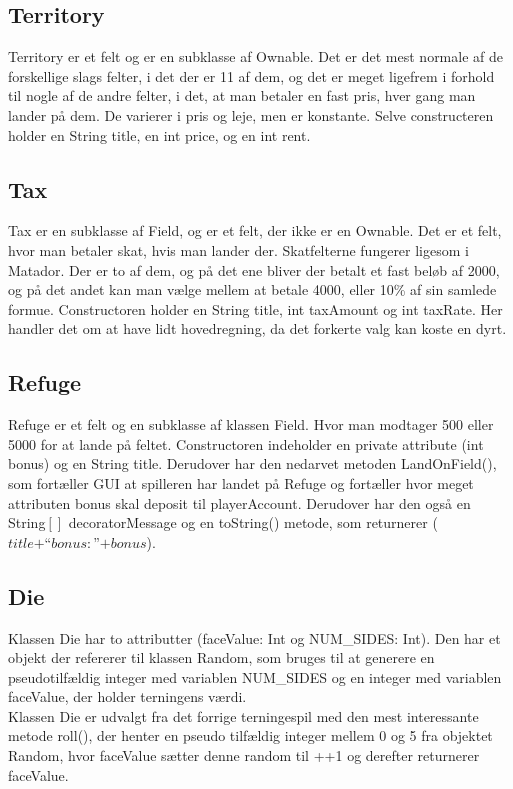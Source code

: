 \subsection*{Territory}
Territory er et felt og er en subklasse af Ownable. Det er det mest normale af
de forskellige slags felter, i det der er 11 af dem, og det er meget ligefrem i
forhold til nogle af de andre felter, i det, at man betaler en fast pris, hver
gang man lander på dem. De varierer i pris og leje, men er konstante. Selve
constructeren holder en String title, en int price, og en int rent.
\subsection*{Tax}
Tax er en subklasse af Field, og er et felt, der ikke er en Ownable. Det er et
felt, hvor man betaler skat, hvis man lander der. Skatfelterne fungerer ligesom
i Matador. Der er to af dem, og på det ene bliver der betalt et fast beløb af
2000, og på det andet kan man vælge mellem at betale 4000, eller 10\% af sin
samlede formue. Constructoren holder en String title, int taxAmount og int
taxRate. Her handler det om at have lidt hovedregning, da det forkerte valg
kan koste en dyrt.
\subsection*{Refuge}
Refuge er et felt og en subklasse af klassen Field. Hvor man modtager 500 eller
5000 for at lande på feltet. Constructoren indeholder en private attribute (int
bonus) og en String title.  Derudover har den nedarvet metoden LandOnField(),
som fortæller GUI at spilleren har landet på Refuge og fortæller hvor meget
attributen bonus skal deposit til playerAccount. Derudover har den også en
String$[]$ decoratorMessage og en toString() metode, som returnerer ($title +
“bonus:” + bonus$).
\subsection*{Die}
Klassen Die har to attributter (faceValue: Int og NUM\_SIDES: Int). Den har et
objekt der refererer til klassen Random, som bruges til at generere en
pseudotilfældig integer med variablen NUM\_SIDES og en integer med variablen
faceValue, der holder terningens værdi.\\
\indent Klassen Die er udvalgt fra det forrige terningespil med den mest
interessante metode roll(), der henter en pseudo tilfældig integer mellem 0 og 5
fra objektet Random, hvor faceValue sætter denne random til {++1} og derefter
returnerer faceValue.
